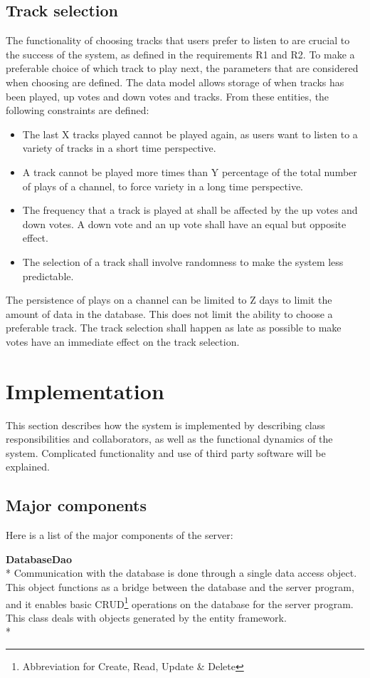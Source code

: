 \documentclass[a4paper,11pt,report]{article}
\begin{document}
{\subsection{Track selection}
The functionality of choosing tracks that users prefer to listen to are crucial to the success of the system, as defined in the requirements R1 and R2. To make a preferable choice of which track to play next, the parameters that are considered when choosing are defined. The data model allows storage of when tracks has been played, up votes and down votes and tracks. From these entities, the following constraints are defined:
\begin{itemize}
\item The last X tracks played cannot be played again, as users want to listen to a variety of tracks in a short time perspective.
\item A track cannot be played more times than Y percentage of the total number of plays of a channel, to force variety in a long time perspective.
\item The frequency that a track is played at shall be affected by the up votes and down votes. A down vote and an up vote shall have an equal but opposite effect.
\item The selection of a track shall involve randomness to make the system less predictable.
\end{itemize}
The persistence of plays on a channel can be limited to Z days to limit the amount of data in the database. This does not limit the ability to choose a preferable track. The track selection shall happen as late as possible to make votes have an immediate effect on the track selection. 

\section{Implementation}
This section describes how the system is implemented by describing class responsibilities and collaborators, as well as the functional dynamics of the system. Complicated functionality and use of third party software will be explained.

\subsection{Major components}
Here is a list of the major components of the server:

\textbf{DatabaseDao} \\*
Communication with the database is done through a single data access object. This object functions as a bridge between the database and the server program, and it enables basic CRUD\footnote{Abbreviation for Create, Read, Update \& Delete} operations on the database for the server program. This class deals with objects generated by the entity framework. \\*

}
\end{document}

